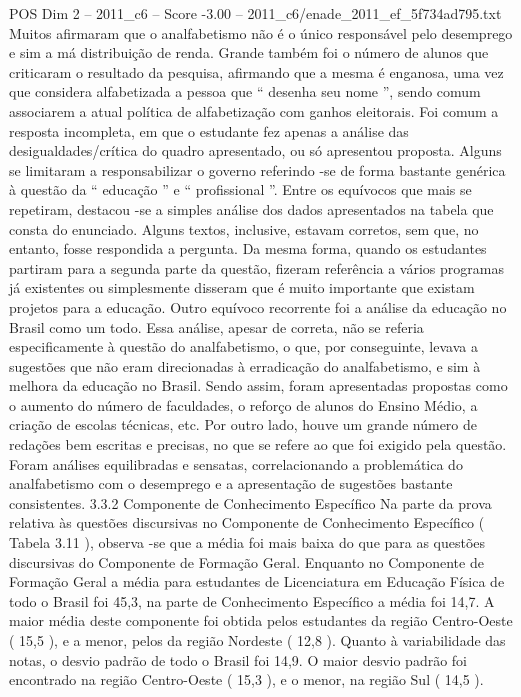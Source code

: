 \begin{textsample}{POS Dim 2 – 2011\_c6 – Score -3.00 – 2011\_c6/enade\_2011\_ef\_5f734ad795.txt}
Muitos afirmaram que o analfabetismo não é o único responsável pelo desemprego e sim a má distribuição de renda.
Grande também foi o número de alunos que criticaram o resultado da pesquisa, afirmando que a mesma é enganosa, uma vez que considera alfabetizada a pessoa que “ desenha seu nome ”, sendo comum associarem a atual política de alfabetização com ganhos eleitorais.
Foi comum a resposta incompleta, em que o estudante fez apenas a análise das desigualdades/crítica do quadro apresentado, ou só apresentou proposta.
Alguns se limitaram a responsabilizar o governo referindo -se de forma bastante genérica à questão da “ educação ” e “ profissional ”.
Entre os equívocos que mais se repetiram, destacou -se a simples análise dos dados apresentados na tabela que consta do enunciado.
Alguns textos, inclusive, estavam corretos, sem que, no entanto, fosse respondida a pergunta.
Da mesma forma, quando os estudantes partiram para a segunda parte da questão, fizeram referência a vários programas já existentes ou simplesmente disseram que é muito importante que existam projetos para a educação.
Outro equívoco recorrente foi a análise da educação no Brasil como um todo.
Essa análise, apesar de correta, não se referia especificamente à questão do analfabetismo, o que, por conseguinte, levava a sugestões que não eram direcionadas à erradicação do analfabetismo, e sim à melhora da educação no Brasil.
Sendo assim, foram apresentadas propostas como o aumento do número de faculdades, o reforço de alunos do Ensino Médio, a criação de escolas técnicas, etc.
Por outro lado, houve um grande número de redações bem escritas e precisas, no que se refere ao que foi exigido pela questão.
Foram análises equilibradas e sensatas, correlacionando a problemática do analfabetismo com o desemprego e a apresentação de sugestões bastante consistentes. 3.3.2 Componente de Conhecimento Específico Na parte da prova relativa às questões discursivas no Componente de Conhecimento Específico ( Tabela 3.11 ), observa -se que a média foi mais baixa do que para as questões discursivas do Componente de Formação Geral.
Enquanto no Componente de Formação Geral a média para estudantes de Licenciatura em Educação Física de todo o Brasil foi 45,3, na parte de Conhecimento Específico a média foi 14,7.
A maior média deste componente foi obtida pelos estudantes da região Centro-Oeste ( 15,5 ), e a menor, pelos da região Nordeste ( 12,8 ).
Quanto à variabilidade das notas, o desvio padrão de todo o Brasil foi 14,9.
O maior desvio padrão foi encontrado na região Centro-Oeste ( 15,3 ), e o menor, na região Sul ( 14,5 ).

\end{textsample}
